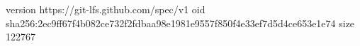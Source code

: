 version https://git-lfs.github.com/spec/v1
oid sha256:2ec9ff67f4b082ce732f2fdbaa98e1981e9557f850f4e33ef7d5d4ce653e1e74
size 122767
